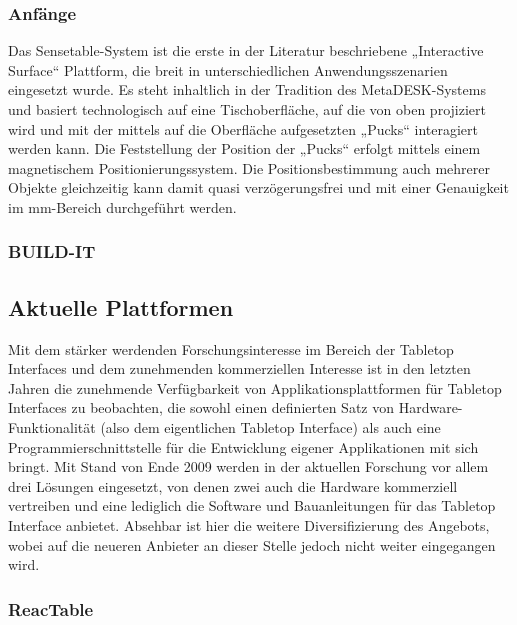 \subsubsection{Anfänge} %
\label{subs:anfaenge}

Das Sensetable-System \citep{Patten01} ist die erste in der Literatur beschriebene „Interactive Surface“ Plattform, die breit in unterschiedlichen Anwendungsszenarien eingesetzt wurde. Es steht inhaltlich in der Tradition des MetaDESK-Systems \citep{Ishii97} und basiert technologisch auf eine Tischoberfläche, auf die von oben projiziert wird und mit der mittels auf die Oberfläche aufgesetzten „Pucks“ interagiert werden kann. Die Feststellung der Position der „Pucks“ erfolgt mittels einem magnetischem Positionierungssystem. Die Positionsbestimmung auch mehrerer Objekte gleichzeitig kann damit quasi verzögerungsfrei und mit einer Genauigkeit im mm-Bereich durchgeführt werden.


\subsubsection{BUILD-IT} %
\label{par:build_it}
\citep{Fjeld01}

\subsection{Aktuelle Plattformen} %
\label{sub:aktuelle_plattformen}
Mit dem stärker werdenden Forschungsinteresse im Bereich der Tabletop Interfaces und dem zunehmenden kommerziellen Interesse ist in den letzten Jahren die zunehmende Verfügbarkeit von Applikationsplattformen für Tabletop Interfaces zu beobachten, die sowohl einen definierten Satz von Hardware-Funktionalität (also dem eigentlichen Tabletop Interface) als auch eine Programmierschnittstelle für die Entwicklung eigener Applikationen mit sich bringt. Mit Stand von Ende 2009 werden in der aktuellen Forschung vor allem drei Lösungen eingesetzt, von denen zwei auch die Hardware kommerziell vertreiben und eine lediglich die Software und Bauanleitungen für das Tabletop Interface anbietet. Absehbar ist hier die weitere Diversifizierung des Angebots, wobei auf die neueren Anbieter an dieser Stelle jedoch nicht weiter eingegangen wird.

\subsubsection{ReacTable} %
\label{ssub:reactable}

